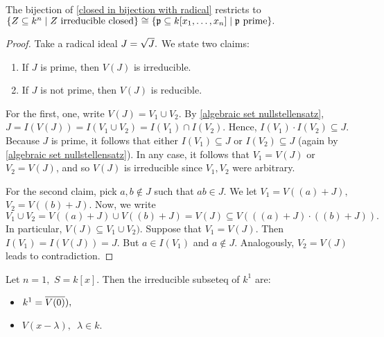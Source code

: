 \begin{prop}
  \label{prime irreducible}
  The bijection of \cref{closed in bijection with radical} restricts to
  \(\{Z \subseteq k^n \mathrel{|} \text{$Z$ irreducible closed}\} \cong \{\mathfrak p \subseteq k[x_1, \dotsc, x_n] \mathrel{|} \text{$\mathfrak p $ prime}\}.\)
\end{prop}
\begin{proof}
  Take a radical ideal \(J = \sqrt{J}.\) We state two claims:
  \begin{enumerate}
  \item If \(J\) is prime, then \(V(J)\) is irreducible.
  \item If \(J\) is not prime, then \(V(J)\) is reducible.
  \end{enumerate}
  For the first, one, write \(V(J) = V_1 \cup V_2.\) By \cref{algebraic set nullstellensatz},
  \(J = I(V(J)) = I(V_1 \cup V_2) = I(V_1) \cap I(V_2).\)
  Hence,
  \(I(V_1) \cdot I(V_2) \subseteq J.\)
  Because \(J\) is prime, it follows that either \(I(V_1) \subseteq J\) or \(I(V_2) \subseteq J\) (again by \cref{algebraic set nullstellensatz}).
  In any case, it follows that \(V_1 = V(J)\) or \(V_2 = V(J)\), and so \(V(J)\) is irreducible since \(V_1, V_2\) were arbitrary.

  For the second claim, pick \(a, b \notin J\) such that \(ab \in J\). We let
  \(V_1 = V((a) + J),\)
  \(V_2 = V((b) + J).\)
  Now, we write
  \[V_1 \cup V_2 = V((a) + J) \cup V((b) + J) = V(J) \subseteq V(((a) + J) \cdot ((b) + J)).\]
  In particular,
  \(V(J) \subseteq V_1 \cup V_2).\)
  Suppose that
  \(V_1 = V(J).\) Then \(I(V_1) = I(V(J)) = J.\)
  But \(a \in I(V_1)\) and \(a \notin J\).
  Analogously, \(V_2 = V(J)\) leads to contradiction.
\end{proof}


\begin{example}
  Let \(n = 1,\) \(S = k[x].\) Then the irreducible subseteq of \(k^1\) are:
  \begin{itemize}
  \item \(k^1 = \overline{V(0)}),\)
  \item \(V(x-\lambda), \enspace \lambda \in k.\)
  \end{itemize}
\end{example}

